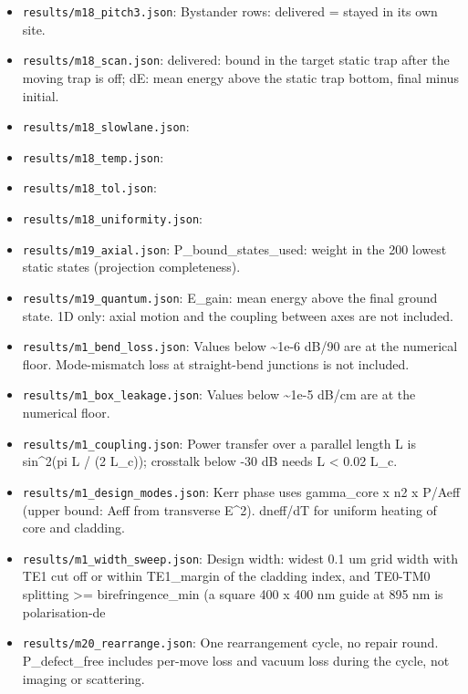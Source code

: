 \begin{itemize}
  \texttt{results/m18\_midlane.json}: Bystander rows:
  \textquotesingle delivered\textquotesingle{} = stayed in its own site.
\item
  \texttt{results/m18\_pitch3.json}: Bystander rows:
  \textquotesingle delivered\textquotesingle{} = stayed in its own site.
\item
  \texttt{results/m18\_scan.json}: delivered: bound in the target static
  trap after the moving trap is off; dE: mean energy above the static
  trap bottom, final minus initial.
\item
  \texttt{results/m18\_slowlane.json}:
\item
  \texttt{results/m18\_temp.json}:
\item
  \texttt{results/m18\_tol.json}:
\item
  \texttt{results/m18\_uniformity.json}:
\item
  \texttt{results/m19\_axial.json}: P\_bound\_states\_used: weight in
  the 200 lowest static states (projection completeness).
\item
  \texttt{results/m19\_quantum.json}: E\_gain: mean energy above the
  final ground state. 1D only: axial motion and the coupling between
  axes are not included.
\item
  \texttt{results/m1\_bend\_loss.json}: Values below \textasciitilde1e-6
  dB/90 are at the numerical floor. Mode-mismatch loss at straight-bend
  junctions is not included.
\item
  \texttt{results/m1\_box\_leakage.json}: Values below
  \textasciitilde1e-5 dB/cm are at the numerical floor.
\item
  \texttt{results/m1\_coupling.json}: Power transfer over a parallel
  length L is sin\^{}2(pi L / (2 L\_c)); crosstalk below -30 dB needs L
  \textless{} 0.02 L\_c.
\item
  \texttt{results/m1\_design\_modes.json}: Kerr phase uses gamma\_core x
  n2 x P/Aeff (upper bound: Aeff from transverse
  \textbar E\textbar\^{}2). dneff/dT for uniform heating of core and
  cladding.
\item
  \texttt{results/m1\_width\_sweep.json}: Design width: widest 0.1 um
  grid width with TE1 cut off or within TE1\_margin of the cladding
  index, and TE0-TM0 splitting \textgreater= birefringence\_min (a
  square 400 x 400 nm guide at 895 nm is polarisation-de
\item
  \texttt{results/m20\_rearrange.json}: One rearrangement cycle, no
  repair round. P\_defect\_free includes per-move loss and vacuum loss
  during the cycle, not imaging or scattering.

\end{itemize}
